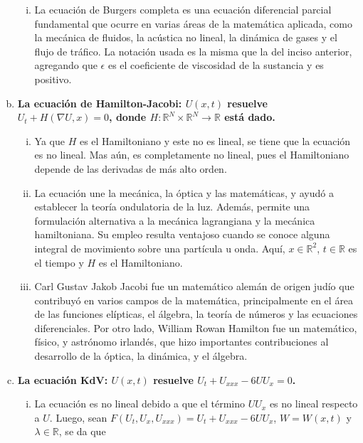 \documentclass[fleqn]{article}
\newcommand{\real}{\mathbb{R}}
\begin{document}
\begin{enumerate}[(a)]
\begin{enumerate}[(i)]
			\item La ecuación de Burgers completa es una ecuación diferencial parcial fundamental que ocurre en varias áreas de la matemática aplicada, como la mecánica de fluidos, la acústica no lineal, la dinámica de gases y el flujo de tráfico. La notación usada es la misma que la del inciso anterior, agregando que $ \epsilon $ es el coeficiente de viscosidad de la sustancia y es positivo.
		\end{enumerate}

		\item \textbf{La ecuación de Hamilton-Jacobi: $ U(x,t) $ resuelve $ U_t + H(\nabla U, x) = 0 $, donde $ H \colon \real^N \times \real^N \to \real $ está dado.}
		
		\begin{enumerate}[(i)]
			\item Ya que $ H $ es el Hamiltoniano y este no es lineal, se tiene que la ecuación es no lineal. Mas aún, es completamente no lineal, pues el Hamiltoniano depende de las derivadas de más alto orden.
			
			\item La ecuación une la mecánica, la óptica y las matemáticas, y ayudó a establecer la teoría ondulatoria de la luz. Además, permite una formulación alternativa a la mecánica lagrangiana y la mecánica hamiltoniana. Su empleo resulta ventajoso cuando se conoce alguna integral de movimiento sobre una partícula u onda. Aquí, $ x \in \real^2 $, $ t \in \real $ es el tiempo y $ H $ es el Hamiltoniano. 
			
			\item Carl Gustav Jakob Jacobi fue un matemático alemán de origen judío que contribuyó en varios campos de la matemática, principalmente en el área de las funciones elípticas, el álgebra, la teoría de números y las ecuaciones diferenciales. Por otro lado, William Rowan Hamilton fue un matemático, físico, y astrónomo irlandés, que hizo importantes contribuciones al desarrollo de la óptica, la dinámica, y el álgebra.
		\end{enumerate}

		\item \textbf{La ecuación KdV: $ U(x,t) $ resuelve $ U_t + U_{xxx} - 6UU_x = 0 $.}
		
		\begin{enumerate}[(i)]
			\item La ecuación es no lineal debido a que el término $ U U_x $ es no lineal respecto a $ U $. Luego, sean $ F(U_t, U_x, U_{xxx}) = U_t + U_{xxx} - 6UU_x $, $ W = W(x,t) $ y $ \lambda \in \real $, se da que 
			

\end{enumerate}
\end{enumerate}
\end{document}
